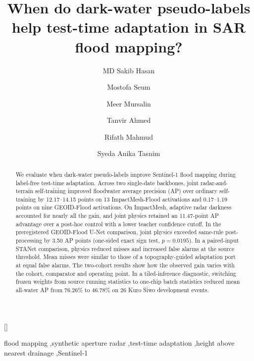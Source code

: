 \documentclass[a4paper,fleqn]{cas-sc}
\begin{document}
\let\WriteBookmarks\relax
\def\floatpagepagefraction{1}
\def\textpagefraction{.001}
\let\printorcid\relax


\title [mode = title]{When do dark-water pseudo-labels help test-time adaptation in SAR flood mapping?}

\author[1]{MD Sakib Hasan}
\author[1]{Mostofa Seum}
\author[1]{Meer Mursalin}
\author[1]{Tanvir Ahmed}[]
\cormark[1]
\author[1]{Rifath Mahmud}
\author[1]{Syeda Anika Tasnim}



\begin{abstract}
We evaluate when dark-water pseudo-labels improve Sentinel-1 flood mapping during label-free test-time adaptation. Across two single-date backbones, joint radar-and-terrain self-training improved floodwater average precision (AP) over ordinary self-training by 12.17--14.15 points on 13 ImpactMesh-Flood activations and 0.17--1.19 points on nine GEOID-Flood activations. On ImpactMesh, adaptive radar darkness accounted for nearly all the gain, and joint physics retained an 11.47-point AP advantage over a post-hoc control with a lower teacher confidence cutoff. In the preregistered GEOID-Flood U-Net comparison, joint physics exceeded same-rule post-processing by 3.50 AP points (one-sided exact sign test, $p=0.0195$). In a paired-input STANet comparison, physics reduced misses and increased false alarms at the source threshold. Mean misses were similar to those of a topography-guided adaptation port at equal false alarms. The two-cohort results show how the observed gain varies with the cohort, comparator and operating point. In a tiled-inference diagnostic, switching frozen weights from source running statistics to one-chip batch statistics reduced mean all-water AP from 76.26\% to 46.78\% on 26 Kuro Siwo development events.
\end{abstract}



\begin{keywords}
flood mapping \sep synthetic aperture radar \sep test-time adaptation  \sep height above nearest drainage \sep Sentinel-1
\end{keywords}
\end{document}
